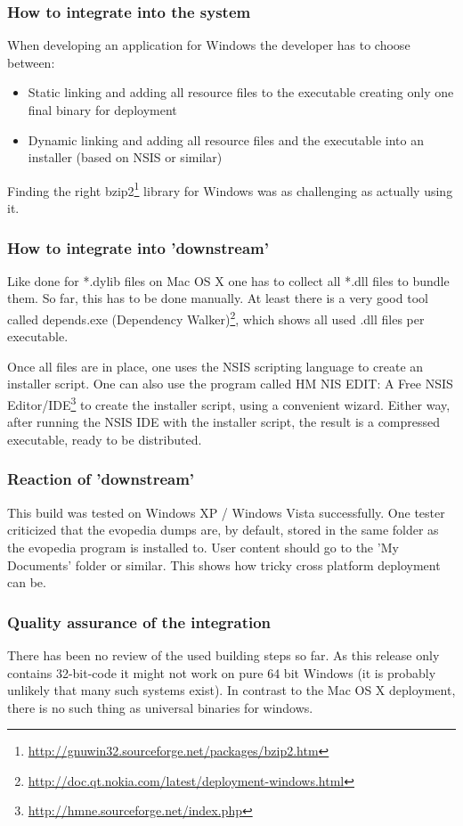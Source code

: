 \documentclass[a4paper,10pt]{article}
\begin{document}
\subsubsection*{How to integrate into the system}
When developing an application for Windows the developer has to choose between:
\begin{itemize}
\item Static linking and adding all resource files to the executable creating only one final binary for deployment
\item Dynamic linking and adding all resource files and the executable into an installer (based on NSIS or similar)
\end{itemize}
Finding the right bzip2\footnote{\url{http://gnuwin32.sourceforge.net/packages/bzip2.htm}} library for Windows was as challenging as actually using it. 

\subsubsection*{How to integrate into 'downstream'}
Like done for *.dylib files on Mac OS X one has to collect all *.dll files to bundle them. So far, this has to be done manually. At least there is a very good tool called depends.exe (Dependency Walker)\footnote{\url{http://doc.qt.nokia.com/latest/deployment-windows.html}}, which shows all used .dll files per executable.

Once all files are in place, one uses the NSIS scripting language to create an installer script. One can also use the program called HM NIS EDIT: A Free NSIS Editor/IDE\footnote{\url{http://hmne.sourceforge.net/index.php}} to create the installer script, using a convenient wizard. Either way, after running the NSIS IDE with the installer script, the result is a compressed executable, ready to be distributed.

\subsubsection*{Reaction of 'downstream'}
This build was tested on Windows XP / Windows Vista successfully. One tester criticized that the evopedia dumps are, by default, stored in the same folder as the evopedia program is installed to. User content should go to the 'My Documents' folder or similar. This shows how tricky cross platform deployment can be.

\subsubsection*{Quality assurance of the integration}
There has been no review of the used building steps so far. As this release only contains 32-bit-code it might not work on pure 64 bit Windows (it is probably unlikely that many such systems exist). In contrast to the Mac OS X deployment, there is no such thing as universal binaries for windows. 
\end{document}
